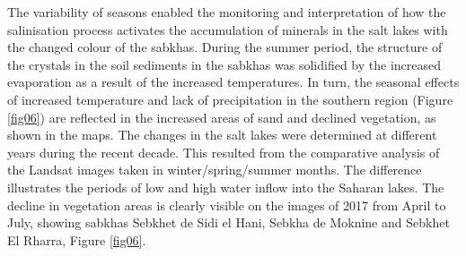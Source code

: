 \documentclass[land,article,accept,pdftex,moreauthors]{Definitions/mdpi}
\begin{document}
{The variability of} seasons enabled the monitoring and interpretation of how the salinisation process {activates} the accumulation of minerals in the salt lakes with the changed colour of the sabkhas. {During }the summer period, the structure of the crystals in the soil sediments in the sabkhas was solidified by the increased evaporation as a result of the increased temperatures. In turn, the seasonal effects of increased temperature and lack of precipitation in the southern region (Figure \ref{fig06}) are reflected in the increased areas of sand and declined vegetation, as shown in the maps. The changes in the salt lakes were determined at different years during the recent decade{. This resulted from the comparative analysis of the }Landsat images taken in winter/spring/summer months. {The difference illustrates the} periods {of low and high }water inflow into the Saharan lakes{. The} decline in vegetation areas is clearly {visible on} the images of 2017 from April to July, showing sabkhas Sebkhet de Sidi el Hani, Sebkha de Moknine  and Sebkhet El Rharra, Figure \ref{fig06}. 
\end{document}
